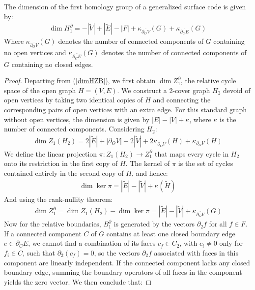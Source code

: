 \documentclass[12pt, twoside, openany]{book}
\begin{document}
\begin{proposition} \label{dim_surface_code}
    The dimension of the first homology group of a generalized surface code is given by:
    \begin{align}
    \dim H_1^\partial =-|\tilde{V}| + |\tilde{E}| - |F| + \kappa_{\overline{\partial_O V}}(G) + \kappa_{\overline{\partial_C E}}(G)
    \end{align}
    Where $\kappa_{\overline{\partial_O V}}(G)$ denotes the number of connected components of $G$ containing no open vertices and $\kappa_{\overline{\partial_C E}}(G)$ denotes the number of connected components of $G$ containing no closed edges.
\end{proposition}

\begin{proof}
    Departing from (\ref{dimHZB}), we first obtain $\dim Z_1^\partial$, the relative cycle space of the open graph $H = (V,E)$. We construct a 2-cover graph $H_2$ devoid of open vertices by taking two identical copies of $H$ and connecting the corresponding pairs of open vertices with an extra edge. For this standard graph without open vertices, the dimension is given by  $|E| - |V| + \kappa$, where $\kappa$ is the number of connected components. Considering $H_2$:
    \begin{align*}       
        \dim Z_1 (H_2) = 2|\tilde{E}| + |\partial_O V| - 2|\tilde{V}| + 2\kappa_{\overline{\partial_O V}}(H) + \kappa_{\partial_O V}(H)
    \end{align*}
    We define the linear projection $\pi : Z_1 (H_2) \rightarrow Z_1^\partial$ that maps every cycle in $H_2$ onto its restriction in the first copy of $H$. The kernel of $\pi$ is the set of cycles contained entirely in the second copy of $H$, and hence:
    \begin{align*}
        \dim \ker \pi = |\tilde{E}| - |\tilde{V}| + \kappa(\tilde{H})
    \end{align*}
    And using the rank-nullity theorem:
    \begin{align} \label{dim_ker}
        \dim Z_1^\partial = \dim Z_1 (H_2) - \dim \ker \pi =|\tilde{E}| - |\tilde{V}| + \kappa_{\overline{\partial_O V}}(G)
    \end{align}
    Now for the relative boundaries, $B_1^\partial$ is generated by the vectors $\partial_2 f$ for all $f \in F$. If a connected component $C$ of $G$ contains at least one closed boundary edge $e \in \partial_C E$, we cannot find a combination of its faces $c_f \in C_2$, with $c_i \neq 0$ only for $f_i \in C$, such that $\partial_2 (c_f) = 0$, so the vectors $\partial_2 f$ associated with faces in this component are linearly independent. If the connected component lacks any closed boundary edge, summing the boundary operators of all faces in the component yields the zero vector. We then conclude that:

\end{proof}
\end{document}
